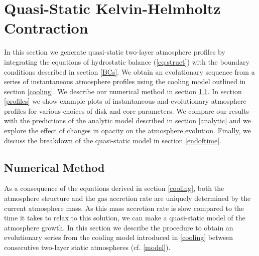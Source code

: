 \documentclass[apj]{emulateapj}
\newcommand{\di}{_{\rm d}}
\newcommand{\cb}{_{\rm RCB}}
\begin{document}
%




\section{Quasi-Static Kelvin-Helmholtz Contraction}
\label{KH}

In this section we generate quasi-static two-layer atmosphere profiles by integrating the equations of hydrostatic balance (\ref{eq:struct}) with the boundary conditions described in section \ref{BCs}. We obtain an evolutionary sequence from a series of instantaneous atmosphere profiles using the cooling model outlined in section \ref{cooling}. We describe our numerical method in section \ref{twolayer}. In section \ref{profiles} we show example plots of instantaneous and evolutionary atmosphere profiles for various choices of disk and core parameters. We compare our results with the predictions of the analytic model described in section \ref{analytic} and we explore the effect of changes in opacity on the atmosphere evolution. Finally, we discuss the breakdown of the quasi-static model in section \ref{endoftime}.

\subsection{Numerical Method}
\label{twolayer}


As a consequence of the equations derived in section \ref{cooling}, both the atmosphere structure and the gas accretion rate are uniquely determined by the current atmosphere mass. As this mass accretion rate is slow compared to the time it takes to relax to this solution, we can make a quasi-static model of the atmosphere growth. In this section we describe the procedure to obtain an evolutionary series from the cooling model introduced in \ref{cooling} between consecutive two-layer static atmospheres (cf. \ref{model}).
\end{document}
